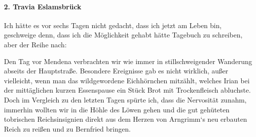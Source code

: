 \paragraph{2. Travia Eslamsbrück}
Ich hätte es vor sechs Tagen nicht gedacht, dass ich jetzt am Leben bin, geschweige denn, dass ich die Möglichkeit gehabt hätte Tagebuch zu schreiben, aber der Reihe nach:

Den Tag vor Mendena verbrachten wir wie immer in stillschweigender Wanderung abseits der Hauptstraße. Besondere Ereignisse gab es nicht wirklich, außer vielleicht, wenn man das wildgewordene Eichhörnchen mitzählt, welches Irian bei der mittäglichen kurzen Essenspause ein Stück Brot mit Trockenfleisch abluchste. Doch im Vergleich zu den letzten Tagen spürte ich, dass die Nervosität zunahm, immerhin wollten wir in die Höhle des Löwen gehen und die gut gehüteten tobrischen Reichsinsignien direkt aus dem Herzen von Arngrimm‘s neu erbauten Reich zu reißen und zu Bernfried bringen.

